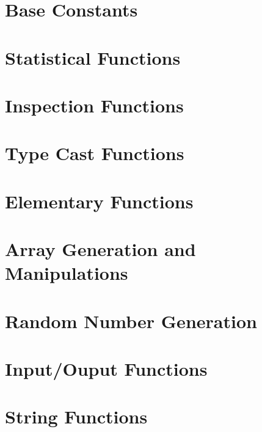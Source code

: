 \documentclass{book}
\begin{document}
\section{Base Constants}





\section{Statistical Functions}


\section{Inspection Functions}












\section{Type Cast Functions}










\section{Elementary Functions}











\section{Array Generation and Manipulations}





\section{Random Number Generation}



\section{Input/Ouput Functions}















\section{String Functions}

\end{document}
